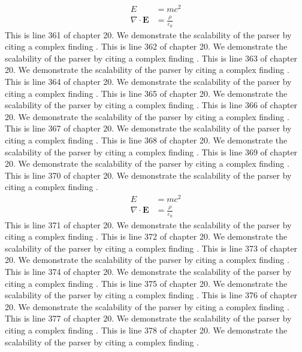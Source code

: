 \begin{align*}
  E &= mc^2 \\
  \nabla \cdot \mathbf{E} &= \frac{\rho}{\varepsilon_0}
\end{align*}
This is line 361 of chapter 20. We demonstrate the scalability of the parser by citing a complex finding \cite{ref20_361}.
This is line 362 of chapter 20. We demonstrate the scalability of the parser by citing a complex finding \cite{ref20_362}.
This is line 363 of chapter 20. We demonstrate the scalability of the parser by citing a complex finding \cite{ref20_363}.
This is line 364 of chapter 20. We demonstrate the scalability of the parser by citing a complex finding \cite{ref20_364}.
This is line 365 of chapter 20. We demonstrate the scalability of the parser by citing a complex finding \cite{ref20_365}.
This is line 366 of chapter 20. We demonstrate the scalability of the parser by citing a complex finding \cite{ref20_366}.
This is line 367 of chapter 20. We demonstrate the scalability of the parser by citing a complex finding \cite{ref20_367}.
This is line 368 of chapter 20. We demonstrate the scalability of the parser by citing a complex finding \cite{ref20_368}.
This is line 369 of chapter 20. We demonstrate the scalability of the parser by citing a complex finding \cite{ref20_369}.
This is line 370 of chapter 20. We demonstrate the scalability of the parser by citing a complex finding \cite{ref20_370}.
\begin{align*}
  E &= mc^2 \\
  \nabla \cdot \mathbf{E} &= \frac{\rho}{\varepsilon_0}
\end{align*}
This is line 371 of chapter 20. We demonstrate the scalability of the parser by citing a complex finding \cite{ref20_371}.
This is line 372 of chapter 20. We demonstrate the scalability of the parser by citing a complex finding \cite{ref20_372}.
This is line 373 of chapter 20. We demonstrate the scalability of the parser by citing a complex finding \cite{ref20_373}.
This is line 374 of chapter 20. We demonstrate the scalability of the parser by citing a complex finding \cite{ref20_374}.
This is line 375 of chapter 20. We demonstrate the scalability of the parser by citing a complex finding \cite{ref20_375}.
This is line 376 of chapter 20. We demonstrate the scalability of the parser by citing a complex finding \cite{ref20_376}.
This is line 377 of chapter 20. We demonstrate the scalability of the parser by citing a complex finding \cite{ref20_377}.
This is line 378 of chapter 20. We demonstrate the scalability of the parser by citing a complex finding \cite{ref20_378}.
